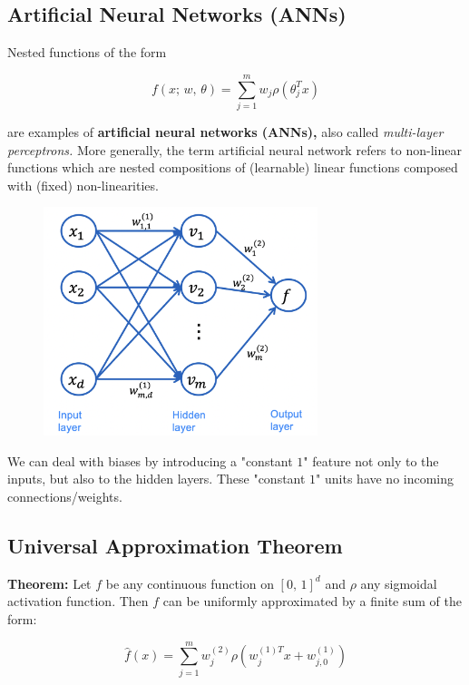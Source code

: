 \documentclass[a4paper]{extarticle}
\begin{document}
\subsection{Artificial Neural Networks (ANNs)}

Nested functions of the form

\[
    f(x; \, w, \, \theta) = \sum_{j = 1}^m w_j \rho (\theta_j^T x)
\]

are examples of \textbf{artificial neural networks (ANNs),} also called \textit{multi-layer perceptrons.} More generally, the term artificial neural network refers to non-linear functions which are nested compositions of (learnable) linear functions composed with (fixed) non-linearities.

\begin{figure}[H]
    \includegraphics[width=8cm]{../images/IntroML_Fig6-1}
    \centering
\end{figure}

We can deal with biases by introducing a "constant $1$" feature not only to the inputs, but also to the hidden layers. These "constant $1$" units have no incoming connections/weights.

\subsection{Universal Approximation Theorem}

\begin{tbox}
    \textbf{Theorem:} Let $f$ be any continuous function on $[0, \, 1]^d$ and $\rho$ any sigmoidal activation function. Then $f$ can be uniformly approximated by a finite sum of the form:

    \[
        \hat{f}(x) = \sum_{j = 1}^m w_j^{(2)}\rho(w_j^{(1)T}x + w_{j,0}^{(1)})
    \]
\end{tbox}
\end{document}
